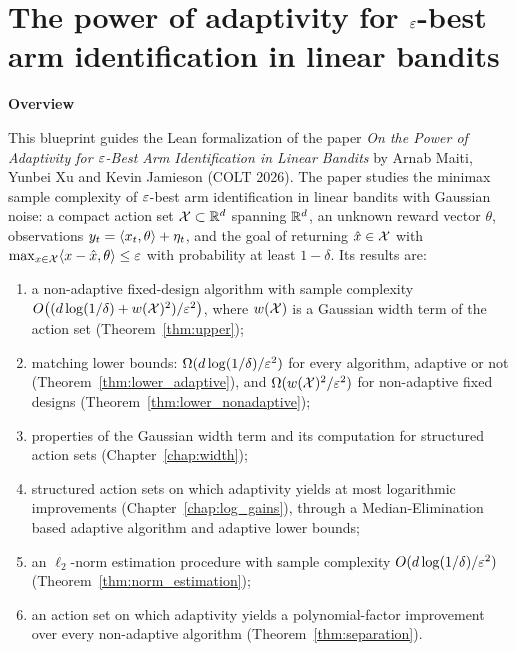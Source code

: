 %

\part{The power of adaptivity for \texorpdfstring{$\varepsilon$}{epsilon}-best arm identification in linear bandits}
\label{part:main}

\textbf{Overview}

This blueprint guides the Lean formalization of the paper
\emph{On the Power of Adaptivity for $\varepsilon$-Best Arm Identification in Linear Bandits}
by Arnab Maiti, Yunbei Xu and Kevin Jamieson (COLT 2026). The paper studies the minimax
sample complexity of $\varepsilon$-best arm identification in linear bandits with Gaussian noise:
a compact action set $\mathcal{X} \subset \mathbb{R}^d$ spanning $\mathbb{R}^d$, an unknown reward vector $\theta$,
observations $y_t = \langle x_t, \theta \rangle + \eta_t$, and the goal of returning $\hat{x} \in \mathcal{X}$ with
$\max_{x \in \mathcal{X}} \langle x - \hat{x}, \theta \rangle \le \varepsilon$ with probability at least $1 - \delta$.
Its results are:
\begin{enumerate}
  \item[(i)] a non-adaptive fixed-design algorithm with sample complexity
        $O\big((d\log(1/\delta) + w(\mathcal{X})^2)/\varepsilon^2\big)$, where $w(\mathcal{X})$ is a Gaussian
        width term of the action set (Theorem~\ref{thm:upper});
  \item[(ii)] matching lower bounds: $\Omega(d\log(1/\delta)/\varepsilon^2)$ for every algorithm,
        adaptive or not (Theorem~\ref{thm:lower_adaptive}), and
        $\Omega(w(\mathcal{X})^2/\varepsilon^2)$ for non-adaptive fixed designs
        (Theorem~\ref{thm:lower_nonadaptive});
  \item[(iii)] properties of the Gaussian width term and its computation for structured
        action sets (Chapter~\ref{chap:width});
  \item[(iv)] structured action sets on which adaptivity yields at most logarithmic
        improvements (Chapter~\ref{chap:log_gains}), through a Median-Elimination based
        adaptive algorithm and adaptive lower bounds;
  \item[(v)] an $\ell_2$-norm estimation procedure with sample complexity
        $O(d\log(1/\delta)/\varepsilon^2)$ (Theorem~\ref{thm:norm_estimation});
  \item[(vi)] an action set on which adaptivity yields a polynomial-factor improvement over
        every non-adaptive algorithm (Theorem~\ref{thm:separation}).
\end{enumerate}

